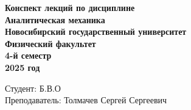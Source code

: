 \documentclass[12pt, a4paper,oneside]{book}
\begin{document}
\begin{titlepage}
    \thispagestyle{empty}  %
    \centering
    \vspace*{1cm}  %

    \textbf{\huge Конспект лекций по дисциплине}  \\[1.5cm]  %
    \textbf{\huge Аналитическая механика}  \\[1.5cm]  %
    \textbf{\Large Новосибирский государственный университет} \\[0.5cm]
    \textbf{\large Физический факультет} \\[0.5cm]
    \textbf{\large 4-й семестр} \\[0.5cm]
    \textbf{\large 2025 год} \\[12.5cm]

    \begin{flushright}
        \large Студент: Б.В.О \\[0.5cm]  %
        Преподаватель: Толмачев Сергей Сергеевич  %
    \end{flushright}
\end{titlepage}

\tableofcontents  %

\newpage

\def\mainfile{}  %

\end{document}
